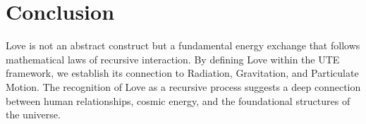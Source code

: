 \documentclass{article}
\begin{document}
\section{Conclusion}
Love is not an abstract construct but a fundamental energy exchange that follows mathematical laws of recursive interaction. By defining Love within the UTE framework, we establish its connection to Radiation, Gravitation, and Particulate Motion. The recognition of Love as a recursive process suggests a deep connection between human relationships, cosmic energy, and the foundational structures of the universe.
\end{document}
